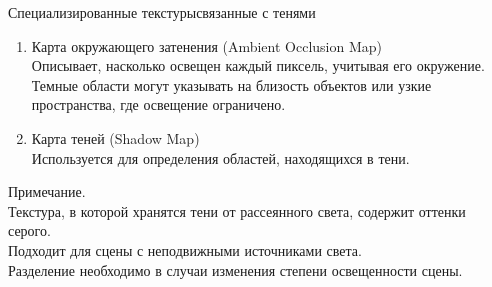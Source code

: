 \documentclass{beamer}
\begin{document}
	\begin{frame}{Специализированные текстуры}{связанные с тенями}
		\begin{enumerate}
			\item Карта окружающего затенения (Ambient Occlusion Map)\\ 
			Описывает, насколько освещен каждый пиксель, учитывая его окружение. Темные области могут указывать на близость объектов или узкие пространства, где освещение ограничено.
			\item Карта теней (Shadow Map)\\ 
			Используется для определения областей, находящихся в тени.
		\end{enumerate}
		
		Примечание.\\
		Текстура, в которой хранятся тени от рассеянного света, содержит оттенки серого.\\
		Подходит для сцены с неподвижными источниками света.\\
		Разделение необходимо в случаи изменения степени освещенности сцены. \\
	
	\end{frame}
\end{document}
